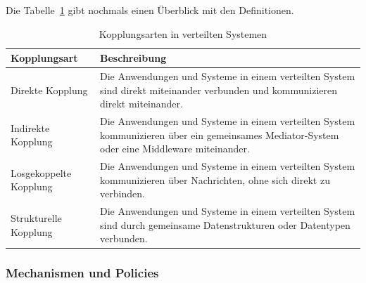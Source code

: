 \documentclass[../vs-script-first-v01.tex]{subfiles}
\begin{document}
Die Tabelle~\ref{tab:kopplungsarten} gibt nochmals einen Überblick mit den Definitionen. 
\begin{table}[!ht]
  \centering
  \caption{Kopplungsarten in verteilten Systemen}
  \label{tab:kopplungsarten}
  \begin{tabular}{|p{4cm}|p{7cm}|}
    \hline
    \textbf{Kopplungsart} & \textbf{Beschreibung} \\ \hline
    Direkte Kopplung & Die Anwendungen und Systeme in einem verteilten System sind direkt miteinander verbunden und kommunizieren direkt miteinander. \\ \hline
    Indirekte Kopplung & Die Anwendungen und Systeme in einem verteilten System kommunizieren über ein gemeinsames Mediator-System oder eine Middleware miteinander. \\ \hline
    Losgekoppelte Kopplung & Die Anwendungen und Systeme in einem verteilten System kommunizieren über Nachrichten, ohne sich direkt zu verbinden. \\ \hline
    Strukturelle Kopplung & Die Anwendungen und Systeme in einem verteilten System sind durch gemeinsame Datenstrukturen oder Datentypen verbunden. \\ \hline
  \end{tabular}
\end{table}
\newpage
\subsubsection{Mechanismen und Policies}
\end{document}
